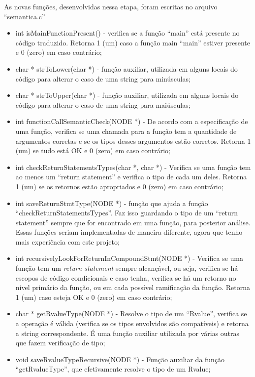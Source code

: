 \documentclass[12pt]{article}
\begin{document}
\indent

As novas funções, desenvolvidas nessa etapa, foram escritas no arquivo ``semantica.c''

\begin{itemize}
	\item int isMainFunctionPresent() - verifica se a função ``main'' está presente no código traduzido. Retorna 1 (um) caso a função main ``main'' estiver presente e 0 (zero) em caso contrário;
	\item char * strToLower(char *) - função auxiliar, utilizada em alguns locais do código para alterar o caso de uma string para minúsculas;
	\item char * strToUpper(char *) - função auxiliar, utilizada em alguns locais do código para alterar o caso de uma string para maiúsculas;
	\item int functionCallSemanticCheck(NODE *) - De acordo com a especificação de uma função, verifica se uma chamada para a função tem a quantidade de argumentos corretas e se os tipos desses argumentos estão corretos. Retorna 1 (um) se tudo está OK e 0 (zero) em caso contrário;
	\item int checkReturnStatementsTypes(char *, char *) - Verifica se uma função tem ao menos um ``return statement'' e verifica o tipo de cada um deles. Retorna 1 (um) se os retornos estão apropriados e 0 (zero) em caso contrário;
	\item int saveReturnStmtType(NODE *) - função que ajuda a função ``checkReturnStatementsTypes''. Faz isso guardando o tipo de um ``return statement'' sempre que for encontrado em uma função, para posterior análise. Essas funções seriam implementadas de maneira diferente, agora que tenho mais experiência com este projeto;
	\item int recursivelyLookForReturnInCompoundStmt(NODE *) - Verifica se uma função tem um \textit{return statement} sempre alcançável, ou seja, verifica se há escopos de código condicionais e caso tenha, verifica se há um retorno no nível primário da função, ou em cada possível ramificação da função. Retorna 1 (um) caso esteja OK e 0 (zero) em caso contrário;
	\item char * getRvalueType(NODE *) - Resolve o tipo de um ``Rvalue'', verifica se a operação é válida (verifica se os tipos envolvidos são compatíveis) e retorna a string correspondente. É uma função auxiliar utilizada por várias outras que fazem verificação de tipo;
	\item void saveRvalueTypeRecursive(NODE *) - Função auxiliar da função ``getRvalueType'', que efetivamente resolve o tipo de um Rvalue;

\end{itemize}
\end{document}

